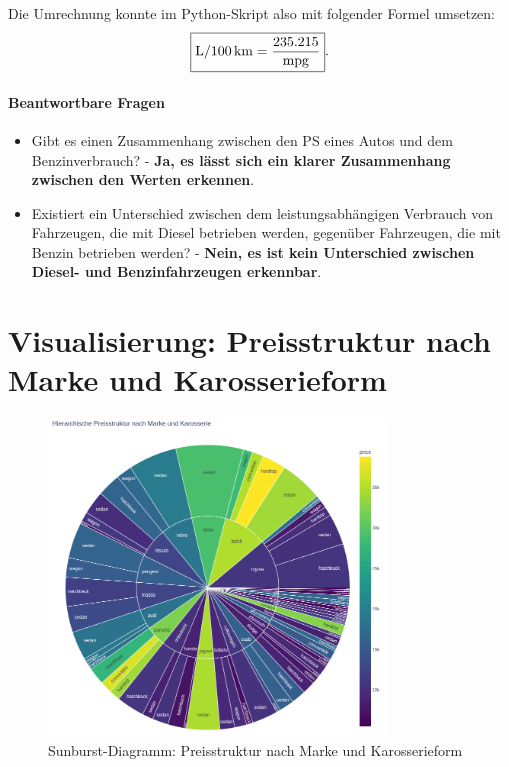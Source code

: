 \documentclass[a4paper,12pt]{article}
\begin{document}
Die Umrechnung konnte im Python-Skript also mit folgender Formel umsetzen:
\[
\boxed{\text{L/100\,km} = \frac{235.215}{\text{mpg}}}.
\]

\hfill \break


\paragraph{Beantwortbare Fragen}
\begin{itemize}
  \item Gibt es einen Zusammenhang zwischen den PS eines Autos und dem Benzinverbrauch? - 
    \textbf{Ja, es lässt sich ein klarer Zusammenhang zwischen den Werten erkennen}.
  \item Existiert ein Unterschied zwischen dem leistungsabhängigen Verbrauch von Fahrzeugen, die mit Diesel betrieben werden, gegenüber
    Fahrzeugen, die mit Benzin betrieben werden? - \textbf{Nein, es ist kein Unterschied zwischen Diesel- und Benzinfahrzeugen erkennbar}.
\end{itemize}


\section{Visualisierung: Preisstruktur nach Marke und Karosserieform}
\begin{figure}[H]
    \centering
    \includegraphics[width=0.8\textwidth]{../images/preisstruktur_nach_marke_karosserie.png} %
    \caption{Sunburst-Diagramm: Preisstruktur nach Marke und Karosserieform}
    \label{fig:vis3}
\end{figure}
\end{document}
